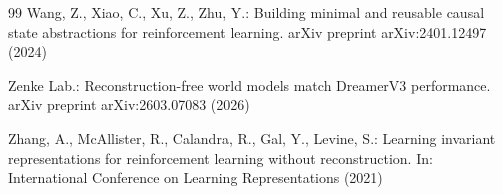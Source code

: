 \documentclass[runningheads]{llncs}
\begin{document}
\begin{thebibliography}{99}
Wang, Z., Xiao, C., Xu, Z., Zhu, Y.:
Building minimal and reusable causal state abstractions for reinforcement learning.
arXiv preprint arXiv:2401.12497 (2024)

Zenke Lab.:
Reconstruction-free world models match DreamerV3 performance.
arXiv preprint arXiv:2603.07083 (2026)

Zhang, A., McAllister, R., Calandra, R., Gal, Y., Levine, S.:
Learning invariant representations for reinforcement learning without reconstruction.
In: International Conference on Learning Representations (2021)

\end{thebibliography}
\end{document}
